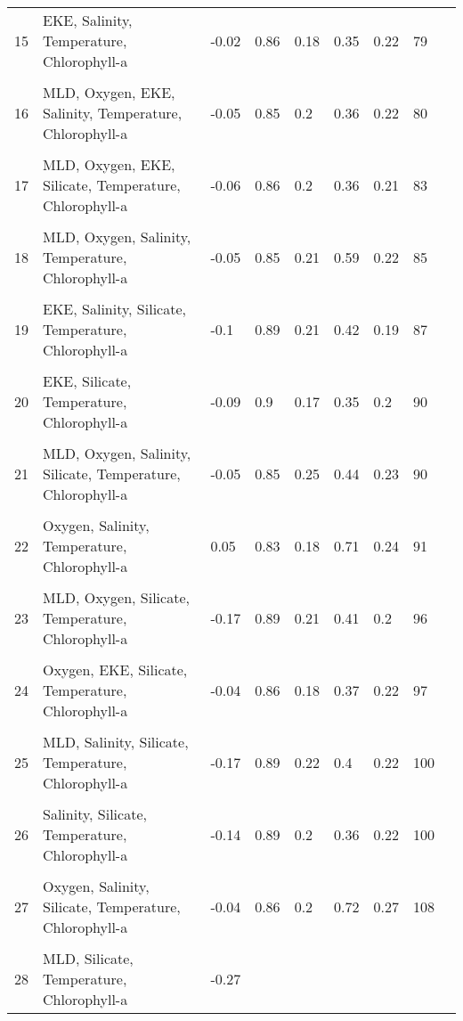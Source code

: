 \begin{table}[h]
\begin{tabularx}{\textwidth}{lXlllllll}
15 &
  EKE, Salinity, Temperature, Chlorophyll-a &
  -0.02 &
  0.86 &
  0.18 &
  0.35 &
  0.22 &
  79 \\ \\
16 &
  MLD, Oxygen, EKE, Salinity, Temperature, Chlorophyll-a &
  -0.05 &
  0.85 &
  0.2 &
  0.36 &
  0.22 &
  80 \\ \\
17 &
  MLD, Oxygen, EKE, Silicate, Temperature, Chlorophyll-a &
  -0.06 &
  0.86 &
  0.2 &
  0.36 &
  0.21 &
  83 \\ \\
18 &
  MLD, Oxygen, Salinity, Temperature, Chlorophyll-a &
  -0.05 &
  0.85 &
  0.21 &
  0.59 &
  0.22 &
  85 \\ \\
19 &
  EKE, Salinity, Silicate, Temperature, Chlorophyll-a &
  -0.1 &
  0.89 &
  0.21 &
  0.42 &
  0.19 &
  87 \\ \\
20 &
  EKE, Silicate, Temperature, Chlorophyll-a &
  -0.09 &
  0.9 &
  0.17 &
  0.35 &
  0.2 &
  90 \\ \\
21 &
  MLD, Oxygen, Salinity, Silicate, Temperature, Chlorophyll-a &
  -0.05 &
  0.85 &
  0.25 &
  0.44 &
  0.23 &
  90 \\ \\
22 &
  Oxygen, Salinity, Temperature, Chlorophyll-a &
  0.05 &
  0.83 &
  0.18 &
  0.71 &
  0.24 &
  91 \\ \\
23 &
  MLD, Oxygen, Silicate, Temperature, Chlorophyll-a &
  -0.17 &
  0.89 &
  0.21 &
  0.41 &
  0.2 &
  96 \\ \\
24 &
  Oxygen, EKE, Silicate, Temperature, Chlorophyll-a &
  -0.04 &
  0.86 &
  0.18 &
  0.37 &
  0.22 &
  97 \\ \\
25 &
  MLD, Salinity, Silicate, Temperature, Chlorophyll-a &
  -0.17 &
  0.89 &
  0.22 &
  0.4 &
  0.22 &
  100 \\ \\
26 &
 Salinity, Silicate, Temperature, Chlorophyll-a &
  -0.14 &
  0.89 &
  0.2 &
  0.36 &
  0.22 &
  100 \\ \\
27 &
  Oxygen, Salinity, Silicate, Temperature, Chlorophyll-a &
  -0.04 &
  0.86 &
  0.2 &
  0.72 &
  0.27 &
  108 \\ \\
28 &
  MLD, Silicate, Temperature, Chlorophyll-a &
  -0.27 &

\end{tabularx}
\end{table}
